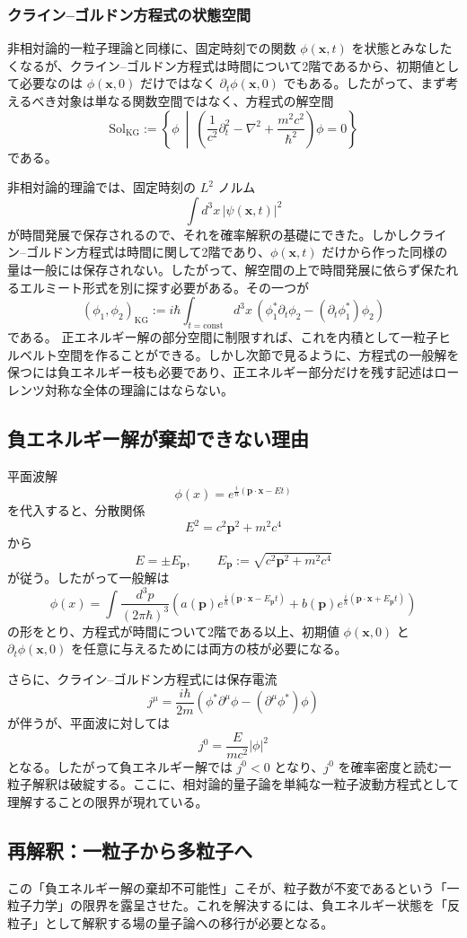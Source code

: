 \subsubsection*{クライン--ゴルドン方程式の状態空間}
非相対論的一粒子理論と同様に、固定時刻での関数 $\phi(\mathbf{x},t)$ を状態とみなしたくなるが、クライン--ゴルドン方程式は時間について2階であるから、初期値として必要なのは $\phi(\mathbf{x},0)$ だけではなく $\partial_t\phi(\mathbf{x},0)$ でもある。したがって、まず考えるべき対象は単なる関数空間ではなく、方程式の解空間
\[
\mathrm{Sol}_{\mathrm{KG}}
:=
\left\{
\phi \ \middle|\
\left( \frac{1}{c^2} \partial_t^2 - \nabla^2 + \frac{m^2 c^2}{\hbar^2} \right)\phi = 0
\right\}
\]
である。

非相対論的理論では、固定時刻の $L^2$ ノルム
\[
\int d^3x\,|\psi(\mathbf{x},t)|^2
\]
が時間発展で保存されるので、それを確率解釈の基礎にできた。しかしクライン--ゴルドン方程式は時間に関して2階であり、$\phi(\mathbf{x},t)$ だけから作った同様の量は一般には保存されない。したがって、解空間の上で時間発展に依らず保たれるエルミート形式を別に探す必要がある。その一つが
\[
(\phi_1,\phi_2)_{\mathrm{KG}}
:=
i\hbar \int_{t=\mathrm{const}} d^3x\,
\left(
\phi_1^* \partial_t \phi_2
-
(\partial_t \phi_1^*)\phi_2
\right)
\]
である。
正エネルギー解の部分空間に制限すれば、これを内積として一粒子ヒルベルト空間を作ることができる。しかし次節で見るように、方程式の一般解を保つには負エネルギー枝も必要であり、正エネルギー部分だけを残す記述はローレンツ対称な全体の理論にはならない。

\subsection{負エネルギー解が棄却できない理由}
平面波解
\[
\phi(x)=e^{\frac{i}{\hbar}(\mathbf{p}\cdot \mathbf{x}-Et)}
\]
を代入すると、分散関係
\[
E^2=c^2\mathbf{p}^2+m^2c^4
\]
から
\[
E=\pm E_{\mathbf{p}},
\qquad
E_{\mathbf{p}}:=\sqrt{c^2\mathbf{p}^2+m^2c^4}
\]
が従う。したがって一般解は
\[
\phi(x)=
\int \frac{d^3p}{(2\pi\hbar)^3}
\left(
a(\mathbf{p})e^{\frac{i}{\hbar}(\mathbf{p}\cdot \mathbf{x}-E_{\mathbf{p}}t)}
+
b(\mathbf{p})e^{\frac{i}{\hbar}(\mathbf{p}\cdot \mathbf{x}+E_{\mathbf{p}}t)}
\right)
\]
の形をとり、方程式が時間について2階である以上、初期値 $\phi(\mathbf{x},0)$ と $\partial_t\phi(\mathbf{x},0)$ を任意に与えるためには両方の枝が必要になる。

さらに、クライン--ゴルドン方程式には保存電流
\[
j^\mu
= \frac{i\hbar}{2m}
\left(
\phi^*\partial^\mu \phi
-
(\partial^\mu \phi^*)\phi
\right)
\]
が伴うが、平面波に対しては
\[
j^0 = \frac{E}{mc^2}|\phi|^2
\]
となる。したがって負エネルギー解では $j^0<0$ となり、$j^0$ を確率密度と読む一粒子解釈は破綻する。ここに、相対論的量子論を単純な一粒子波動方程式として理解することの限界が現れている。

\subsection{再解釈：一粒子から多粒子へ}
この「負エネルギー解の棄却不可能性」こそが、粒子数が不変であるという「一粒子力学」の限界を露呈させた。これを解決するには、負エネルギー状態を「反粒子」として解釈する場の量子論への移行が必要となる。
